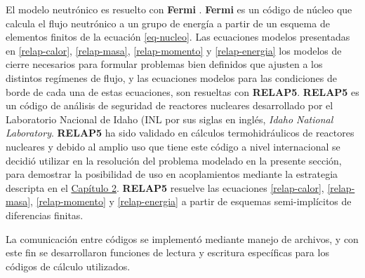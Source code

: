 El modelo neutrónico es resuelto con \textbf{Fermi} \cite{fermi}.
\textbf{Fermi} es un código de núcleo que calcula el flujo neutrónico a un grupo de energía a partir de un esquema de elementos finitos de la ecuación \ref{eq-nucleo}.
Las ecuaciones modelos presentadas en \ref{relap-calor}, \ref{relap-masa}, \ref{relap-momento} y \ref{relap-energia}
los modelos de cierre necesarios para formular problemas bien definidos que ajusten a los distintos regímenes de flujo,
y las ecuaciones modelos para las condiciones de borde de cada una de estas ecuaciones,
son resueltas con \textbf{RELAP5}.
\textbf{RELAP5} es un código de análisis de seguridad de reactores nucleares desarrollado por el Laboratorio Nacional de Idaho (INL por sus siglas en inglés, \textit{Idaho National Laboratory}.
\textbf{RELAP5} ha sido validado en cálculos termohidráulicos de reactores nucleares y debido al amplio uso que tiene este código a nivel internacional
se decidió utilizar en la resolución del problema modelado en la presente sección,
para demostrar la posibilidad de uso en acoplamientos mediante la estrategia descripta en el \hyperlink{chapter.2}{Capítulo 2}.
\textbf{RELAP5} resuelve las ecuaciones \ref{relap-calor}, \ref{relap-masa}, \ref{relap-momento} y \ref{relap-energia} a partir de esquemas semi-implícitos de diferencias finitas.

La comunicación entre códigos se implementó mediante manejo de archivos,
y con este fin se desarrollaron funciones de lectura y escritura específicas para los códigos de cálculo utilizados.


